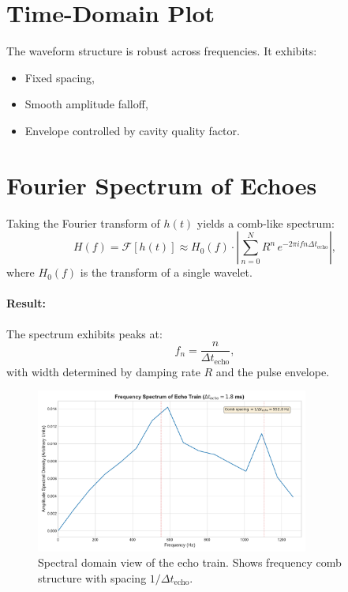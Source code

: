 \documentclass[a4paper, 12pt, oneside]{book}
\numberwithin{equation}{chapter}
\begin{document}
\section{Time-Domain Plot}
\label{sec:TimePlot}

The waveform structure is robust across frequencies.  
It exhibits:

\begin{itemize}
  \item Fixed spacing,
  \item Smooth amplitude falloff,
  \item Envelope controlled by cavity quality factor.
\end{itemize}

\section{Fourier Spectrum of Echoes}
\label{sec:Fourier}

Taking the Fourier transform of \( h(t) \) yields a comb-like spectrum:
\[
    H(f) = \mathcal{F}[h(t)] \approx H_0(f) \cdot
    \left|\sum_{n=0}^{N} R^n \, e^{-2\pi i f n \Delta t_{\text{echo}}}\right|,
\]
where \( H_0(f) \) is the transform of a single wavelet.

\paragraph{Result:}
The spectrum exhibits peaks at:
\[
    f_n = \frac{n}{\Delta t_{\text{echo}}},
\]
with width determined by damping rate \( R \) and the pulse envelope.

\begin{figure}[ht]
    \centering
    \includegraphics[width=0.8\textwidth]{figures/echo_spectrum.pdf}
    \caption[Spectral domain view of the echo train]{Spectral domain view of the echo train.
    Shows frequency comb structure with spacing \( 1 / \Delta t_{\text{echo}} \).}
    \label{fig:spectral-comb}
\end{figure}
\end{document}
